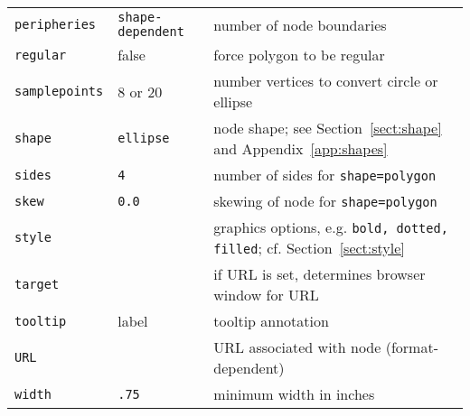 \documentclass[11pt]{article}
\begin{document}
{\begin{tabular}[t]{|l|l|p{3.0in}|}
{\tt peripheries} & {\tt shape-dependent} & number of node boundaries \\
{\tt regular} & false & force polygon to be regular \\
{\tt samplepoints} & 8 or 20 & number vertices to convert circle or ellipse \\
{\tt shape} & {\tt ellipse} & node shape; see Section~\ref{sect:shape} and
Appendix~\ref{app:shapes}\\
{\tt sides} & {\tt 4} & number of sides for {\tt shape=polygon} \\
{\tt skew} & {\tt 0.0} & skewing of node for {\tt shape=polygon} \\
{\tt style} & & graphics options, e.g. {\tt bold, dotted, filled};
cf. Section~\ref{sect:style} \\ 
{\tt target} & & if URL is set, determines browser window for URL \\
{\tt tooltip} & label & tooltip annotation \\
{\tt URL} & & URL associated with node (format-dependent) \\
{\tt width} & {\tt .75} & minimum width in inches \\
\hline
\end{tabular}

}
\end{document}
